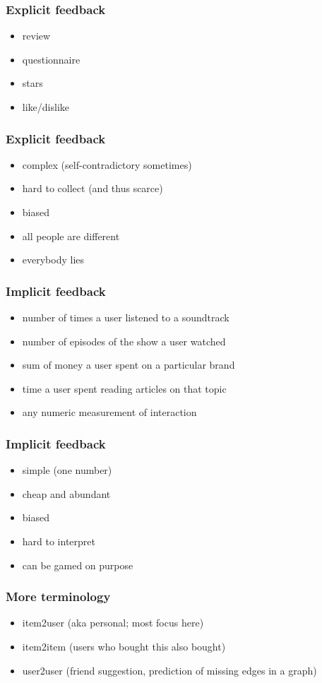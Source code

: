 \documentclass[t]{beamer}
\begin{document}
\begin{frame}
  \frametitle{Explicit feedback}
  \begin{itemize}
  \item review
  \item questionnaire
  \item stars
  \item like/dislike
  \end{itemize}
\end{frame}
\begin{frame}
  \frametitle{Explicit feedback}
  \begin{itemize}
  \item complex (self-contradictory sometimes)
  \item hard to collect (and thus scarce)
  \item biased
  \item all people are different
  \item everybody lies
  \end{itemize}
\end{frame}
\begin{frame}
  \frametitle{Implicit feedback}
  \begin{itemize}
  \item number of times a user listened to a soundtrack
  \item number of episodes of the show a user watched
  \item sum of money a user spent on a particular brand
  \item time a user spent reading articles on that topic
  \item any numeric measurement of interaction
  \end{itemize}
\end{frame}
\begin{frame}
  \frametitle{Implicit feedback}
  \begin{itemize}
  \item simple (one number)
  \item cheap and abundant
  \item biased
  \item hard to interpret
  \item can be gamed on purpose
  \end{itemize}
\end{frame}
\begin{frame}
  \frametitle{More terminology}
  \begin{itemize}
  \item item2user (aka personal; most focus here)
  \item item2item (users who bought this also bought)
  \item user2user (friend suggestion, prediction of missing edges in a graph)
  \end{itemize}
\end{frame}
\end{document}
